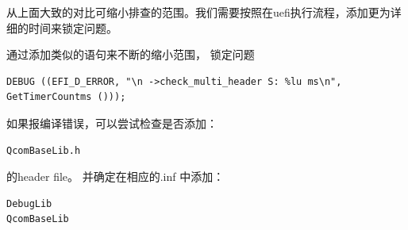 从上面大致的对比可缩小排查的范围。我们需要按照在uefi执行流程，添加更为详细的时间来锁定问题。

通过添加类似的语句来不断的缩小范围， 锁定问题


\begin{lstlisting}
DEBUG ((EFI_D_ERROR, "\n ->check_multi_header S: %lu ms\n", GetTimerCountms ()));
\end{lstlisting}

如果报编译错误，可以尝试检查是否添加：
\begin{lstlisting}
QcomBaseLib.h
\end{lstlisting}
的header file。
并确定在相应的.inf 中添加： 
\begin{lstlisting}
DebugLib
QcomBaseLib
\end{lstlisting}



